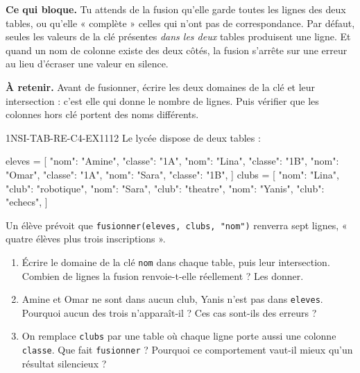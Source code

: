 

\textbf{Ce qui bloque.} Tu attends de la fusion qu'elle garde toutes les lignes des deux
tables, ou qu'elle « complète » celles qui n'ont pas de correspondance. Par défaut, seules les
valeurs de la clé présentes \emph{dans les deux} tables produisent une ligne. Et quand un
nom de colonne existe des deux côtés, la fusion s'arrête sur une erreur au lieu d'écraser
une valeur en silence.

\textbf{À retenir.} Avant de fusionner, écrire les deux domaines de la clé et leur
intersection : c'est elle qui donne le nombre de lignes. Puis vérifier que les colonnes hors
clé portent des noms différents.

\begin{exercice}{1NSI-TAB-RE-C4-EX1}{1}{12}
Le lycée dispose de deux tables :
\begin{python}
eleves = [
    {"nom": "Amine", "classe": "1A"},
    {"nom": "Lina", "classe": "1B"},
    {"nom": "Omar", "classe": "1A"},
    {"nom": "Sara", "classe": "1B"},
]
clubs = [
    {"nom": "Lina", "club": "robotique"},
    {"nom": "Sara", "club": "theatre"},
    {"nom": "Yanis", "club": "echecs"},
]
\end{python}
Un élève prévoit que \lstinline{fusionner(eleves, clubs, "nom")} renverra sept lignes, «
quatre élèves plus trois inscriptions ».
\begin{enumerate}
  \item Écrire le domaine de la clé \lstinline{nom} dans chaque table, puis leur
        intersection. Combien de lignes la fusion renvoie-t-elle réellement ? Les donner.
  \item Amine et Omar ne sont dans aucun club, Yanis n'est pas dans \lstinline{eleves}.
        Pourquoi aucun des trois n'apparaît-il ? Ces cas sont-ils des erreurs ?
  \item On remplace \lstinline{clubs} par une table où chaque ligne porte aussi une colonne
        \lstinline{classe}. Que fait \lstinline{fusionner} ? Pourquoi ce comportement
        vaut-il mieux qu'un résultat silencieux ?
\end{enumerate}
\end{exercice}

